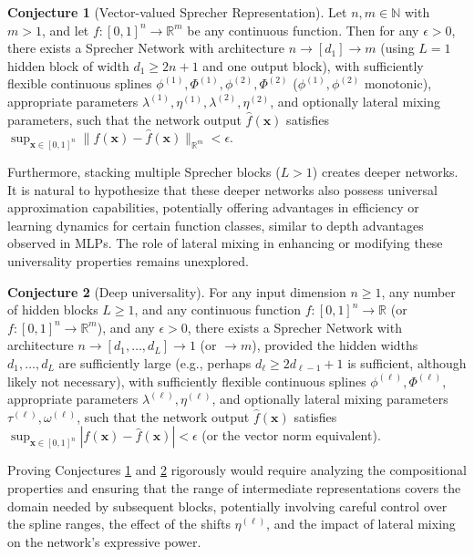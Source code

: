\documentclass{article}
\theoremstyle{plain}
\theoremstyle{definition}
\newtheorem{conjecture}{Conjecture}
\theoremstyle{remark}
\begin{document}
\begin{conjecture}[Vector-valued Sprecher Representation]\label{conj:vector}
Let $n, m \in \mathbb{N}$ with $m > 1$, and let $f:[0,1]^n \to \mathbb{R}^m$ be any continuous function. Then for any $\epsilon > 0$, there exists a Sprecher Network with architecture $n \to [d_1] \to m$ (using $L=1$ hidden block of width $d_1 \ge 2n+1$ and one output block), with sufficiently flexible continuous splines $\phi^{(1)}, \Phi^{(1)}, \phi^{(2)}, \Phi^{(2)}$ ($\phi^{(1)}, \phi^{(2)}$ monotonic), appropriate parameters $\lambda^{(1)}, \eta^{(1)}, \lambda^{(2)}, \eta^{(2)}$, and optionally lateral mixing parameters, such that the network output $\hat{f}(\mathbf{x})$ satisfies $\sup_{\mathbf{x} \in [0,1]^n} \|f(\mathbf{x}) - \hat{f}(\mathbf{x})\|_{\mathbb{R}^m} < \epsilon$.
\end{conjecture}

Furthermore, stacking multiple Sprecher blocks ($L > 1$) creates deeper networks. It is natural to hypothesize that these deeper networks also possess universal approximation capabilities, potentially offering advantages in efficiency or learning dynamics for certain function classes, similar to depth advantages observed in MLPs. The role of lateral mixing in enhancing or modifying these universality properties remains unexplored.

\begin{conjecture}[Deep universality]\label{conj:deep_universal}
For any input dimension $n \ge 1$, any number of hidden blocks $L \ge 1$, and any continuous function $f: [0,1]^n \to \mathbb{R}$ (or $f: [0,1]^n \to \mathbb{R}^m$), and any $\epsilon > 0$, there exists a Sprecher Network with architecture $n \to [d_1, \dots, d_L] \to 1$ (or $\to m$), provided the hidden widths $d_1, \dots, d_L$ are sufficiently large (e.g., perhaps $d_\ell \ge 2 d_{\ell-1} + 1$ is sufficient, although likely not necessary), with sufficiently flexible continuous splines $\phi^{(\ell)}, \Phi^{(\ell)}$, appropriate parameters $\lambda^{(\ell)}, \eta^{(\ell)}$, and optionally lateral mixing parameters $\tau^{(\ell)}, \omega^{(\ell)}$, such that the network output $\hat{f}(\mathbf{x})$ satisfies $\sup_{\mathbf{x} \in [0,1]^n} |f(\mathbf{x}) - \hat{f}(\mathbf{x})| < \epsilon$ (or the vector norm equivalent).
\end{conjecture}

Proving Conjectures \ref{conj:vector} and \ref{conj:deep_universal} rigorously would require analyzing the compositional properties and ensuring that the range of intermediate representations covers the domain needed by subsequent blocks, potentially involving careful control over the spline ranges, the effect of the shifts $\eta^{(\ell)}$, and the impact of lateral mixing on the network's expressive power.
\end{document}
